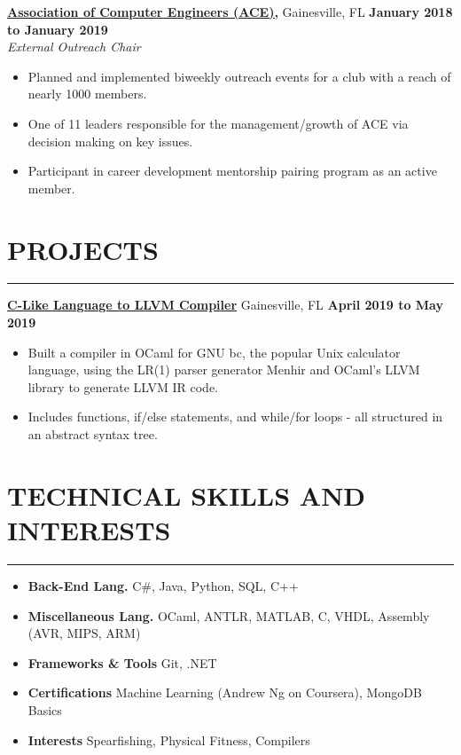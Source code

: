 \documentclass[11pt]{article} %
\begin{document}
		\noindent \href{https://uf-ace.com/}{\textbf{Association of Computer Engineers (ACE),}} Gainesville, FL \hfill\textbf{January 2018 to January 2019}\\
		\textit{External Outreach Chair}
		\begin{itemize}[noitemsep,nolistsep, label={-}]
			\item Planned and implemented biweekly outreach events for a club with a reach of nearly 1000 members.
			\item One of 11 leaders responsible for the management/growth of ACE via decision making on key issues.
			\item Participant in career development mentorship pairing program as an active member.
		\end{itemize}
		\vspace{.20cm}
	
	\section*{PROJECTS}
		\hrule \relax
		\vspace{.4cm}
		
		\noindent \href{https://github.com/hodsonus/programming-language-concepts}{\textbf{C-Like Language to LLVM Compiler}} Gainesville, FL  \hfill\textbf{April 2019 to May 2019}
		\begin{itemize}[noitemsep,nolistsep, label={-}]
			\item Built a compiler in OCaml for GNU bc, the popular Unix calculator language, using the LR(1) parser generator Menhir and OCaml's LLVM library to generate LLVM IR code.
			\item Includes functions, if/else statements, and while/for loops - all structured in an abstract syntax tree.
		\end{itemize}
		
		\vspace{.20cm}
	
	\section*{TECHNICAL SKILLS AND INTERESTS}
		\hrule \relax
		\vspace{.4cm}
		
		\begin{itemize}[noitemsep,nolistsep, label={}]
			\item \textbf{Back-End Lang.}                    \tabto*{5cm} C\#, Java, Python, SQL, C++
			\item \textbf{Miscellaneous Lang.}             \tabto*{5cm} OCaml, ANTLR, MATLAB, C, VHDL, Assembly (AVR, MIPS, ARM)
			\item \textbf{Frameworks \& Tools}  \tabto*{5cm} Git, .NET
			\item \textbf{Certifications}			   \tabto*{5cm} Machine Learning (Andrew Ng on Coursera), MongoDB Basics
			\item \textbf{Interests}                     \tabto*{5cm} Spearfishing, Physical Fitness, Compilers
		\end{itemize}
		
\end{document}
